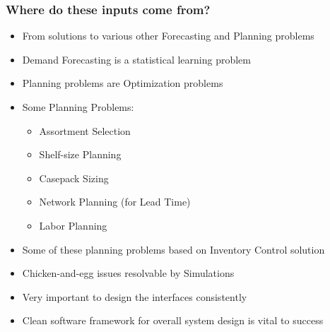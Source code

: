 \documentclass[handout]{beamer}
\begin{document}
\begin{frame}
\frametitle{Where do these inputs come from?}
\pause
\begin{itemize}[<+->]
\item From solutions to various other Forecasting and Planning problems
\item Demand Forecasting is a statistical learning problem
\item Planning problems are Optimization problems
\item Some Planning Problems:
\begin{itemize}
\item Assortment Selection
\item Shelf-size Planning
\item Casepack Sizing
\item Network Planning (for Lead Time)
\item Labor Planning
\end{itemize}
\item Some of these planning problems based on Inventory Control solution
\item Chicken-and-egg issues resolvable by Simulations
\item Very important to design the interfaces consistently
\item Clean software framework for overall system design is vital to success
\end{itemize}
\end{frame}
\end{document}
